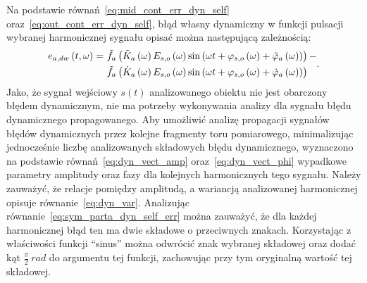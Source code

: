 Na podstawie równań~\eqref{eq:mid_cont_err_dyn_self} oraz~\eqref{eq:out_cont_err_dyn_self}, błąd własny dynamiczny w funkcji pulsacji wybranej harmonicznej sygnału opisać można następującą zależnością:
\begin{equation}
\begin{split}
e_{a,dw} \left(t,\omega\right) =~
& \tilde{f}_{a} \left(\tilde{K}_{a} \left(\omega\right) E_{s,o} \left(\omega\right) \sin \left( \omega t + \varphi_{s,o} \left(\omega\right) + \tilde{\varphi}_{a} \left(\omega\right) \right)\right) - \\
& \tilde{f}_{a} \left(\dot{K}_{a} \left(\omega\right) E_{s,o} \left(\omega\right) \sin \left( \omega t + \varphi_{s,o} \left(\omega\right) + \dot{\varphi}_{a} \left(\omega\right) \right)\right)
\end{split}
\label{eq:sym_parta_dyn_self_err}.
\end{equation}
Jako, że sygnał wejściowy $s(t)$ analizowanego obiektu nie jest obarczony błędem dynamicznym, nie ma potrzeby wykonywania analizy dla sygnału błędu dynamicznego propagowanego. Aby umożliwić analizę propagacji sygnałów błędów dynamicznych przez kolejne fragmenty toru pomiarowego, minimalizując jednocześnie liczbę analizowanych składowych błędu dynamicznego, wyznaczono na podstawie równań~\eqref{eq:dyn_vect_amp} oraz~\eqref{eq:dyn_vect_phi} wypadkowe parametry amplitudy oraz fazy dla kolejnych harmonicznych tego sygnału. Należy zauważyć, że relacje pomiędzy amplitudą, a wariancją analizowanej harmonicznej opisuje równanie~\eqref{eq:dyn_var}. Analizując równanie~\eqref{eq:sym_parta_dyn_self_err} można zauważyć, że dla każdej harmonicznej błąd ten ma dwie składowe o przeciwnych znakach. Korzystając z właściwości funkcji \enquote{sinus} można odwrócić znak wybranej składowej oraz dodać kąt $\frac{\pi}{2}~\unit{rad}$ do argumentu tej funkcji, zachowując przy tym oryginalną wartość tej składowej.

